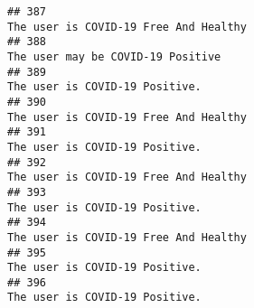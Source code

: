 \documentclass[
]{article}
\begin{document}
\begin{verbatim}
## 387                                                                                                                                                                                                                              The user is COVID-19 Free And Healthy
## 388                                                                                                                                                                                                                                  The user may be COVID-19 Positive
## 389                                                                                                                                                                                                                                     The user is COVID-19 Positive.
## 390                                                                                                                                                                                                                              The user is COVID-19 Free And Healthy
## 391                                                                                                                                                                                                                                     The user is COVID-19 Positive.
## 392                                                                                                                                                                                                                              The user is COVID-19 Free And Healthy
## 393                                                                                                                                                                                                                                     The user is COVID-19 Positive.
## 394                                                                                                                                                                                                                              The user is COVID-19 Free And Healthy
## 395                                                                                                                                                                                                                                     The user is COVID-19 Positive.
## 396                                                                                                                                                                                                                                     The user is COVID-19 Positive.

\end{verbatim}
\end{document}
